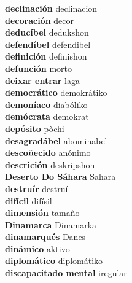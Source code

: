 \textbf{ declinación  } declinacion \\
\textbf{ decoración  } decor \\
\textbf{ deducíbel  } dedukshon \\
\textbf{ defendíbel  } defendibel \\
\textbf{ definición  } definishon \\
\textbf{ defunción  } morto \\
\textbf{ deixar entrar  } laga \\
\textbf{ democrático  } demokrátiko \\
\textbf{ demoníaco  } diabóliko \\
\textbf{ demócrata  } demokrat \\
\textbf{ depósito  } pòchi \\
\textbf{ desagradábel  } abominabel \\
\textbf{ descoñecido  } anónimo \\
\textbf{ descrición  } deskripshon \\
\textbf{ Deserto Do Sáhara  } Sahara \\
\textbf{ destruír  } destruí \\
\textbf{ difícil  } difísil \\
\textbf{ dimensión  } tamaño \\
\textbf{ Dinamarca  } Dinamarka \\
\textbf{ dinamarqués  } Danes \\
\textbf{ dinámico  } aktivo \\
\textbf{ diplomático  } diplomátiko \\
\textbf{ discapacitado mental  } iregular \\
